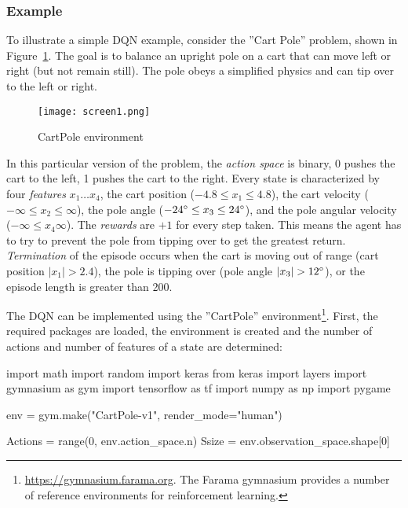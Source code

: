 \subsubsection*{Example}

To illustrate a simple DQN example, consider the ''Cart Pole'' problem, shown in Figure~\ref{fig:screen1_chap22}. The goal is to balance an upright pole on a cart that can move left or right (but not remain still). The pole obeys a simplified physics and can tip over to the left or right.

\begin{figure}
\centering
\texttt{[image: screen1.png]}
\caption{CartPole environment}
\label{fig:screen1_chap22}
\end{figure}

In this particular version of the problem, the \emph{action space} is binary, 0 pushes the cart to the left, 1 pushes the cart to the right. Every state is characterized by four \emph{features} $x_1 \ldots x_4$, the cart position ($-4.8 \leq x_1 \leq 4.8$), the cart velocity ($-\infty \leq x_2 \leq \infty$), the pole angle ($-24\degree \leq x_3 \leq 24\degree$), and the pole angular velocity ($-\infty \leq x_4 \infty$). The \emph{rewards} are $+1$ for every step taken. This means the agent has to try to prevent the pole from tipping over to get the greatest return. \emph{Termination} of the episode occurs when the cart is moving out of range (cart position $|x_1| > 2.4$), the pole is tipping over (pole angle $|x_3| > 12\degree$), or the episode length is greater than 200.

The DQN can be implemented using the ''CartPole'' environment\footnote{\url{https://gymnasium.farama.org}. The Farama gymnasium provides a number of reference environments for reinforcement learning.}. First, the required packages are loaded, the environment is created and the number of actions and number of features of a state are determined:

\begin{samepage}
\begin{pythoncode}
import math
import random
import keras
from keras import layers
import gymnasium as gym
import tensorflow as tf
import numpy as np
import pygame

env = gym.make("CartPole-v1", render_mode="human")

Actions = range(0, env.action_space.n)
Ssize = env.observation_space.shape[0]
\end{pythoncode}
\end{samepage}

